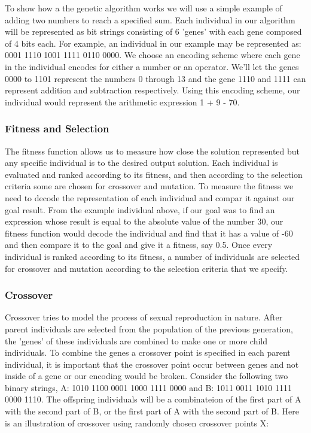 To show how a the genetic algorithm works we will use a simple example of adding two numbers to reach a specified sum. 
Each individual in our algorithm will be represented as bit strings consisting of 6 'genes' with each gene composed of 4
bits each. For example, an individual in our example may be represented as:  0001 1110 1001 1111 0110 0000. We choose an
encoding scheme where each gene in the individual encodes for either a number or an operator. We'll let  the genes 0000 to 
1101 represent the numbers 0 through 13 and the gene 1110 and 1111 can represent addition and subtraction respectively. Using 
this encoding scheme, our individual would represent the arithmetic expression 1 + 9 - 70.

\subsubsection{Fitness and Selection}
The fitness function allows us to measure how close the solution represented but any specific individual is to the desired 
output solution. Each individual is evaluated and ranked according to its fitness, and then according to the selection 
criteria some are chosen for crossover and mutation. To measure the fitness we need to decode the representation of each 
individual and compar it against our goal result. From the example individual above, if our goal was to find an expression 
whose result is equal to the absolute value of the number 30, our fitness function would decode the individual and find that 
it has a value of -60 and then compare it to the goal and give it a fitness, say 0.5. Once every individual is ranked according 
to its fitness, a number of individuals are selected for crossover and mutation according to the selection criteria that we specify.


\subsubsection{Crossover}
Crossover tries to model the process of sexual reproduction in nature. After parent individuals are selected from the 
population of the previous generation, the 'genes' of these individuals are combined to make one or more child individuals. To 
combine the genes a crossover point is specified in each parent individual, it is important that the crossover point occur between genes
and not inside of a gene or our encoding would be broken. Consider the following two binary strings, A: 1010 1100 0001 1000 1111 0000 
and B: 1011 0011 1010 1111 0000 1110. The offspring individuals will be a combinateion of the first part of A with the second part of B, 
or the first part of A with the second part of B. Here is an illustration of crossover using randomly chosen crossover points X:

